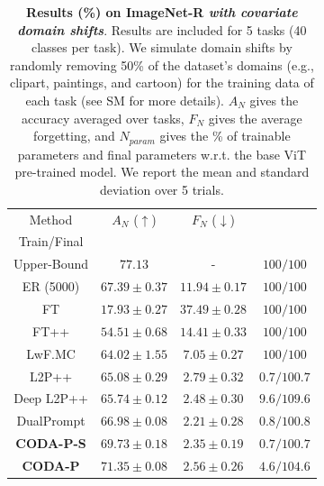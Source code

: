 \begin{table}[t]
\caption{\textbf{Results (\%) on ImageNet-R \emph{with covariate domain shifts}}. Results are included for 5 tasks (40 classes per task). We simulate domain shifts by randomly removing 50\% of the dataset's domains (e.g., clipart, paintings, and cartoon) for the training data of each task (see SM for more details). $A_N$ gives the accuracy averaged over tasks, $F_N$ gives the average forgetting, and $N_{param}$ gives the \% of trainable parameters and final parameters w.r.t. the base ViT pre-trained model. We report the mean and standard deviation over 5 trials.}
\vspace{-2mm}
\centering
\label{tab_2:imnet-r_domainshift}
\begin{tabular}{c||c|c|c} 
\hline
\rule{0pt}{10pt} Method & $A_N$ ($\uparrow$) & $F_N$ ($\downarrow$) & \thead{$N_{param}$ ($\downarrow$) \\ Train/Final}\\
\hline
Upper-Bound  & $77.13$ & - & $100/100$  \\  
\hline
ER (5000)    & $67.39 \pm 0.37$ & $11.94 \pm 0.17$ & $100/100$  \\  
FT           & $17.93 \pm 0.27$ & $37.49 \pm 0.28$ & $100/100$  \\
FT++         & $54.51 \pm 0.68$ & $14.41 \pm 0.33$ & $100/100$  \\
LwF.MC       & $64.02 \pm 1.55$ & $7.05 \pm 0.27$ & $100/100$  \\
L2P++        & $65.08 \pm 0.29$ & $2.79 \pm 0.32$ & $ 0.7/100.7$  \\
Deep L2P++   & $65.74 \pm 0.12$ & $2.48 \pm 0.30$ & $ 9.6/109.6$ \\  
DualPrompt   & $66.98 \pm 0.08$ & $\bm{2.21 \pm 0.28}$ & $ 0.8/100.8$  \\
\hdashline
\textbf{CODA-P-S}  & $69.73 \pm 0.18$ & $2.35 \pm 0.19$ & $ 0.7/100.7$  \\ 
\textbf{CODA-P}    & $\bm{71.35 \pm 0.08}$ & $2.56 \pm 0.26$ & $ 4.6/104.6$  \\

\hline
\end{tabular}
\end{table}








